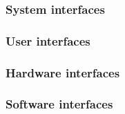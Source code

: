 \subsubsection{System interfaces}


\subsubsection{User interfaces}


\subsubsection{Hardware interfaces}


\subsubsection{Software interfaces}

